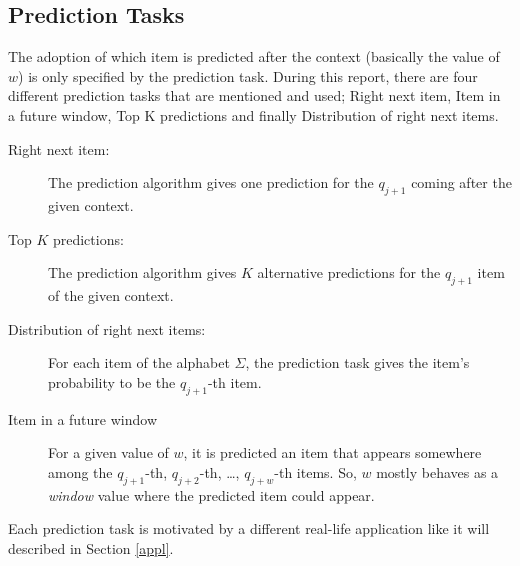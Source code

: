 \subsection{Prediction Tasks} \label{predtask}
The adoption of which item is predicted after the context (basically the value of \(w\)) is only specified by the prediction task. During this report, there are four different prediction tasks that are mentioned and used; Right next item, Item in a future window, Top K predictions and finally Distribution of right next items. 

\begin{description}
  \item[Right next item:] The prediction algorithm gives one prediction for the \(q_{j+1}\) coming after the given context.
  \item[Top $K$ predictions:]  The prediction algorithm gives $K$ alternative predictions for the \(q_{j+1}\) item of the given context.
  \item[Distribution of right next items:]  For each item of the alphabet \(\Sigma\), the prediction task gives the item's probability to be the \(q_{j+1}\)-th item.
  \item[Item in a future window]  For a given value of \(w\), it is predicted an item that appears somewhere among the \(q_{j+1}\)-th, \(q_{j+2}\)-th, \ldots, \(q_{j+w}\)-th items. So, \(w\) mostly behaves as a \emph{window} value where the predicted item could appear. 
\end{description}

Each prediction task is motivated by a different real-life application like it will described in Section \ref{appl}.




